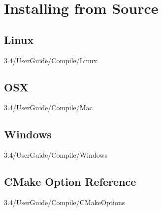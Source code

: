 \section{Installing from Source}

\subsection{Linux}
3.4/UserGuide/Compile/Linux

\subsection{OSX}
3.4/UserGuide/Compile/Mac

\subsection{Windows}
3.4/UserGuide/Compile/Windows

\subsection{CMake Option Reference}
3.4/UserGuide/Compile/CMakeOptions
